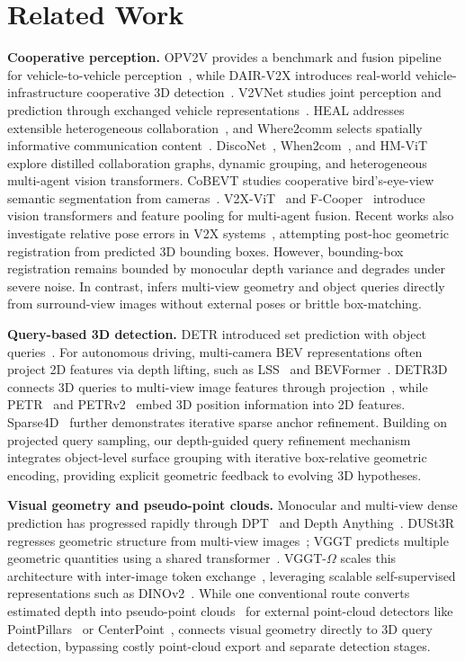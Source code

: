 \section{Related Work}
\textbf{Cooperative perception.} OPV2V provides a benchmark and fusion pipeline for vehicle-to-vehicle perception~\cite{opv2v}, while DAIR-V2X introduces real-world vehicle-infrastructure cooperative 3D detection~\cite{dairv2x}. V2VNet studies joint perception and prediction through exchanged vehicle representations~\cite{v2vnet}. HEAL addresses extensible heterogeneous collaboration~\cite{heal}, and Where2comm selects spatially informative communication content~\cite{where2comm}. DiscoNet~\cite{disconet}, When2com~\cite{when2com}, and HM-ViT~\cite{hmvit} explore distilled collaboration graphs, dynamic grouping, and heterogeneous multi-agent vision transformers. CoBEVT studies cooperative bird's-eye-view semantic segmentation from cameras~\cite{cobevt}. V2X-ViT~\cite{v2xvit} and F-Cooper~\cite{fcooper} introduce vision transformers and feature pooling for multi-agent fusion. Recent works also investigate relative pose errors in V2X systems~\cite{v2xreg,freealign}, attempting post-hoc geometric registration from predicted 3D bounding boxes. However, bounding-box registration remains bounded by monocular depth variance and degrades under severe noise. In contrast, \method{} infers multi-view geometry and object queries directly from surround-view images without external poses or brittle box-matching.

\textbf{Query-based 3D detection.} DETR introduced set prediction with object queries~\cite{detr}. For autonomous driving, multi-camera BEV representations often project 2D features via depth lifting, such as LSS~\cite{lss} and BEVFormer~\cite{bevformer}. DETR3D connects 3D queries to multi-view image features through projection~\cite{detr3d}, while PETR~\cite{petr} and PETRv2~\cite{petrv2} embed 3D position information into 2D features. Sparse4D~\cite{sparse4d} further demonstrates iterative sparse anchor refinement. Building on projected query sampling, our depth-guided query refinement mechanism integrates object-level surface grouping with iterative box-relative geometric encoding, providing explicit geometric feedback to evolving 3D hypotheses.

\textbf{Visual geometry and pseudo-point clouds.} Monocular and multi-view dense prediction has progressed rapidly through DPT~\cite{dpt} and Depth Anything~\cite{depthanything}. DUSt3R regresses geometric structure from multi-view images~\cite{dust3r}; VGGT predicts multiple geometric quantities using a shared transformer~\cite{vggt}. VGGT-$\Omega$ scales this architecture with inter-image token exchange~\cite{omega}, leveraging scalable self-supervised representations such as DINOv2~\cite{dinov2}. While one conventional route converts estimated depth into pseudo-point clouds~\cite{pseudolidar} for external point-cloud detectors like PointPillars~\cite{pointpillars} or CenterPoint~\cite{centerpoint}, \method{} connects visual geometry directly to 3D query detection, bypassing costly point-cloud export and separate detection stages.
